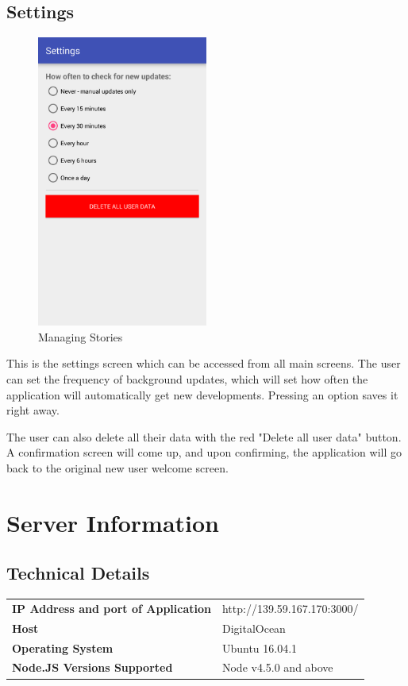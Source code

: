 \documentclass[11pt,titlepage]{report}
\begin{document}
\section{Settings}
\begin{figure}
	\vspace{-1cm}
	\begin{center}
		\includegraphics[width=0.5\textwidth]{img/settingsScreen.png}
	\end{center}
	\caption{Managing Stories}
	\vspace{-2.5cm}
\end{figure}
This is the settings screen which can be accessed from all main screens. The user can set the frequency of background updates, which will set how often the application will automatically get new developments. Pressing an option saves it right away. 

The user can also delete all their data with the red "Delete all user data" button. A confirmation screen will come up, and upon confirming, the application will go back to the original new user welcome screen. 

\chapter{Server Information}\label{appendix:serverInfo}
\section{Technical Details}
\renewcommand{\arraystretch}{1.5}
\begin{tabular}{>{\bfseries}l l}
IP Address and port of Application & http://139.59.167.170:3000/ \\
Host & DigitalOcean \\
Operating System & Ubuntu 16.04.1 \\
Node.JS Versions Supported & Node v4.5.0 and above
\end{tabular}
\end{document}
